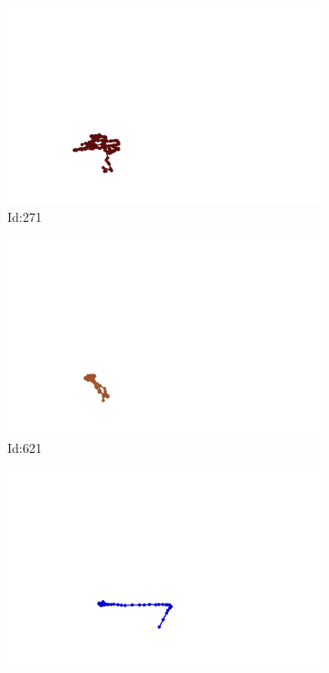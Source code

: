 \documentclass[12pt,twoside]{report}
\begin{document}
\begin{figure}
\centering
\begin{subfigure}[b]{0.20\textwidth}
\centering
\includegraphics[width=\textwidth]{../../trajectories/271.png}
\caption{Id:271}
\end{subfigure}
\begin{subfigure}[b]{0.20\textwidth}
\centering
\includegraphics[width=\textwidth]{../../trajectories/621.png}
\caption{Id:621}
\end{subfigure}
\begin{subfigure}[b]{0.20\textwidth}
\centering
\includegraphics[width=\textwidth]{../../trajectories/756.png}

\end{subfigure}
\end{figure}
\end{document}
